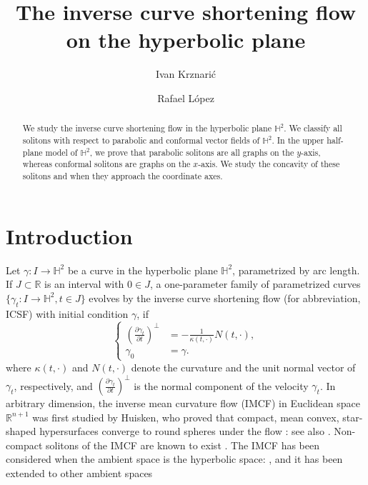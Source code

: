 \documentclass[12pt]{amsart}
\theoremstyle{plain}
\theoremstyle{definition}
\def\h{\mathbb H}
\def\r{\mathbb R}
\begin{document}
\title{The inverse curve shortening flow on the hyperbolic plane }
\author{Ivan Krznari\'{c}}
\address{Faculty of Economics and Business. University of Zagreb}
\author{Rafael L\'opez}
\address{Departamento de Geometr\'{\i}a y Topolog\'{\i}a Universidad de Granada 18071 Granada, Spain}


\begin{abstract}
We study the inverse curve shortening flow in the hyperbolic plane $\h^2$. We classify all solitons with respect to parabolic  and conformal vector fields of $\h^2$. In the upper half-plane model of $\h^2$, we prove that parabolic solitons are all graphs on the $y$-axis, whereas  conformal solitons are graphs on the $x$-axis. We study the concavity of these solitons and when they approach the coordinate axes.
\end{abstract}

\maketitle

\section{Introduction}

Let $\gamma\colon I\to\h^2$ be a curve in the hyperbolic plane $\h^2$, parametrized by arc length. If $J\subset\r$ is an interval with $0\in J$, a one-parameter family of parametrized curves $\{\gamma_t\colon I\to\h^2, t\in J\}$ evolves by the  inverse curve shortening flow (for abbreviation, ICSF) with initial condition $\gamma$,   if 
\begin{equation}\label{flow}
\left\{
\begin{split}
\left(\frac{\partial \gamma_t}{\partial t}\right)^\perp&= - \frac{1}{\kappa(t,\cdot )} N(t,\cdot ), \\ 
\gamma_0&=\gamma. \end{split}\right.
\end{equation}
 where $\kappa(t,\cdot)$ and $N(t,\cdot)$ denote the curvature and the unit normal vector of $\gamma_t$, respectively, and $ \left(\frac{\partial \gamma_t}{\partial t}\right)^\perp$ is the normal component of the velocity $ \gamma_t$. In arbitrary dimension, the inverse mean curvature flow (IMCF) in Euclidean space $\r^{n+1}$ was first studied by Huisken, who proved that compact, mean convex, star-shaped hypersurfaces converge to round spheres under the flow \cite{ge}: see also \cite{cd,ch}. Non-compact solitons of the IMCF are known to exist \cite{dhw,hi}. 
The IMCF  has been considered when the ambient space is    the hyperbolic space: \cite{bda,ge2,ge3,hw}, and it has been   extended to other ambient spaces \cite{cl,kp,lw,lu,ns,pi1,pi2,sc,zh}
\end{document}
